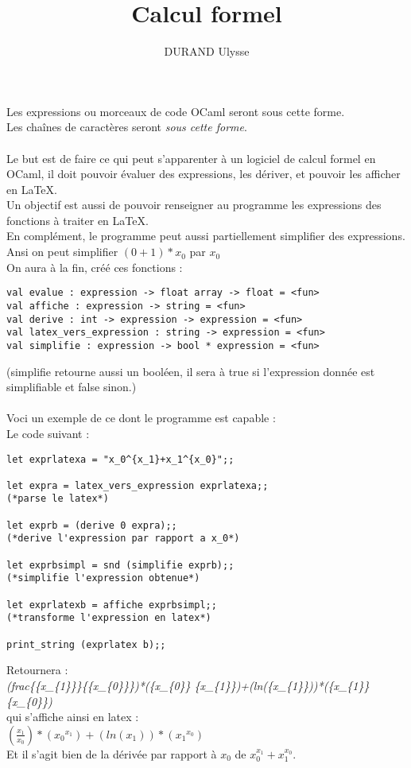 \documentclass{article}
\title{Calcul formel}
\author{DURAND Ulysse}
\date{}
\theoremstyle{definition}
\newcommand{\chcar}[1]{{\fontfamily{lmtt}\selectfont \color{codepurple}\textit{#1}}}
\newcommand{\codecml}[1]{\colorbox{backcolour}{\fontfamily{phv}\selectfont #1}}
\begin{document}
\maketitle
Les expressions ou morceaux de code OCaml seront \codecml{sous cette forme}.\\
Les cha\^ines de caract\`eres seront \chcar{sous cette forme}.\\\\
Le but est de faire ce qui peut s'apparenter \`a un logiciel de calcul formel en OCaml, il doit pouvoir \'evaluer des expressions, les d\'eriver, et pouvoir les afficher en \LaTeX.\\
Un objectif est aussi de pouvoir renseigner au programme les expressions des fonctions \`a traiter en \LaTeX.\\
En compl\'ement, le programme peut aussi partiellement simplifier des expressions. Ansi on peut simplifier $(0+1)*x_0$ par $x_0$ \\
On aura \`a la fin, cr\'e\'e ces fonctions :
\begin{lstlisting}
val evalue : expression -> float array -> float = <fun>
val affiche : expression -> string = <fun>
val derive : int -> expression -> expression = <fun>
val latex_vers_expression : string -> expression = <fun>
val simplifie : expression -> bool * expression = <fun>
\end{lstlisting}
(\codecml{simplifie} retourne aussi un booléen, il sera à \codecml{true} si l'expression donnée est simplifiable et \codecml{false} sinon.)\\\\
Voci un exemple de ce dont le programme est capable :
\\
Le code suivant :

\begin{lstlisting}
let exprlatexa = "x_0^{x_1}+x_1^{x_0}";;

let expra = latex_vers_expression exprlatexa;;
(*parse le latex*)

let exprb = (derive 0 expra);;
(*derive l'expression par rapport a x_0*)

let exprbsimpl = snd (simplifie exprb);;
(*simplifie l'expression obtenue*)

let exprlatexb = affiche exprbsimpl;;
(*transforme l'expression en latex*)

print_string (exprlatex b);;
\end{lstlisting}
Retournera :\\
\chcar{(frac\{\{x\_\{1\}\}\}\{\{x\_\{0\}\}\})*(\{x\_\{0\}\} \{x\_\{1\}\})+(ln(\{x\_\{1\}\}))*(\{x\_\{1\}\}\{x\_\{0\}\})}\\
qui s'affiche ainsi en latex : \\
$\displaystyle \left(\frac{{x_{1}}}{{x_{0}}}\right)*({x_{0}}^{x_{1}})+(ln({x_{1}}))*({x_{1}}^{x_{0}})$\\
Et il s'agit bien de la d\'eriv\'ee par rapport \`a $x_0$ de $x_0^{x_1}+x_1^{x_0}$.\\\\
\end{document}
